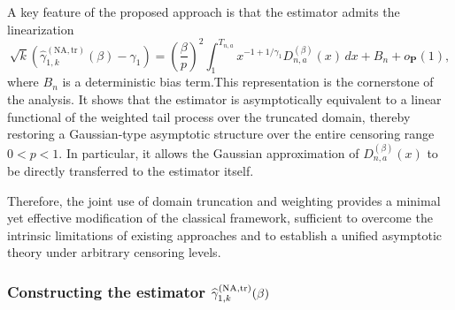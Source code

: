 \documentclass[reqno,openbib,runningheads,a4paper,12pt]{amsart}%
\begin{document}
\noindent A key feature of the proposed approach is that the estimator admits
the linearization
\begin{equation}
\sqrt{k}\left(  \widehat{\gamma}_{1,k}^{(\mathrm{NA,tr})}(\beta)-\gamma
_{1}\right)  =\left(  \frac{\beta}{p}\right)  ^{2}\int_{1}^{T_{n,a}%
}x^{-1+1/\gamma_{1}}D_{n,a}^{(\beta)}(x)\,dx+B_{n}+o_{\mathbf{P}}(1),
\label{functional-key}%
\end{equation}
where $B_{n}$ is a deterministic bias term.\smallskip\noindent This
representation is the cornerstone of the analysis. It shows that the estimator
is asymptotically equivalent to a linear functional of the weighted tail
process over the truncated domain, thereby restoring a Gaussian-type
asymptotic structure over the entire censoring range $0<p<1$. In particular,
it allows the Gaussian approximation of $D_{n,a}^{(\beta)}(x)$ to be directly
transferred to the estimator itself.\smallskip

\noindent Therefore, the joint use of domain truncation and weighting provides
a minimal yet effective modification of the classical framework, sufficient to
overcome the intrinsic limitations of existing approaches and to establish a
unified asymptotic theory under arbitrary censoring levels.

\subsubsection{\textbf{Constructing the estimator} $\protect\widehat{\gamma
}_{1,k}^{(\mathrm{NA,tr})}(\beta)$\textbf{\label{construct}}}
\end{document}
